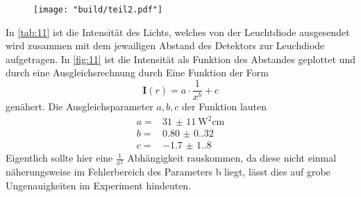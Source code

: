 \begin{figure}[H]
    \caption{}
    \label{fig:11}
    \centering
    \texttt{[image: "build/teil2.pdf"]}
\end{figure}
In \autoref{tab:11} ist die Intensität des Lichts, welches von der Leuchtdiode ausgesendet wird 
zusammen mit dem jewailigen Abstand des Detektors zur Leuchdiode aufgetragen. In \autoref{fig:11}
ist die Intensität als Funktion des Abstandes geplottet und durch eine Ausgleichsrechnung 
durch Eine Funktion der Form 
\begin{equation}
    \symbf{I}\left(r\right) = a \cdot \frac{1}{x^b} + c
\end{equation}
genähert.
Die Ausgleichsparameter $a, b, c$ der Funktion lauten
\begin{align*}
    a = & \qty{31(11)}{\watt\squared\centi\meter}   \\
    b = & \qty{0.80(0.32)}{}     \\
    c = & \qty{-1.7(1.8)}{}       
\end{align*}
Eigentlich sollte hier eine $\frac{1}{x^2}$ Abhängigkeit rauskommen, da diese nicht einmal 
näherungsweise im Fehlerbereich des Parameters b liegt, lässt dies auf grobe Ungenauigkeiten
im Experiment hindeuten.

\label{sec:Auswertung}
